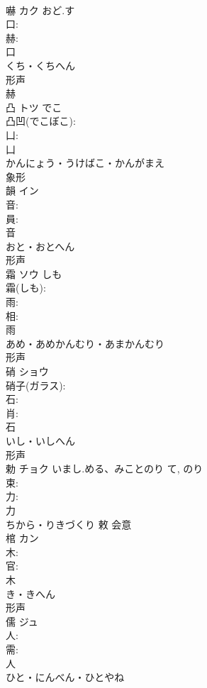 \documentclass[8pt]{extreport}
\begin{document}
\begin{CJK}{UTF8}{min}
\\	嚇	カク	おど.す		
\\	口: 
\\	赫: 
\\	口	
\\	くち・くちへん	
\\	形声 
\\	赫 
\\	凸	トツ	でこ		
\\	凸凹(でこぼこ): 
\\	凵: 
\\	凵	
\\	かんにょう・うけばこ・かんがまえ	
\\	象形 
\\	韻	イン			
\\	音: 
\\	員: 
\\	音	
\\	おと・おとへん	
\\	形声 
\\	霜	ソウ	しも		
\\	霜(しも): 
\\	雨: 
\\	相: 
\\	雨	
\\	あめ・あめかんむり・あまかんむり	
\\	形声 
\\	硝	ショウ			
\\	硝子(ガラス): 
\\	石: 
\\	肖: 
\\	石	
\\	いし・いしへん	
\\	形声 
\\	勅	チョク	いまし.める、みことのり	て, のり	
\\	束: 
\\	力: 
\\	力	
\\	ちから・りきづくり	敕	会意 
\\	棺	カン			
\\	木: 
\\	官: 
\\	木	
\\	き・きへん	
\\	形声 
\\	儒	ジュ			
\\	人: 
\\	需: 
\\	人	
\\	ひと・にんべん・ひとやね	

\end{CJK}
\end{document}
